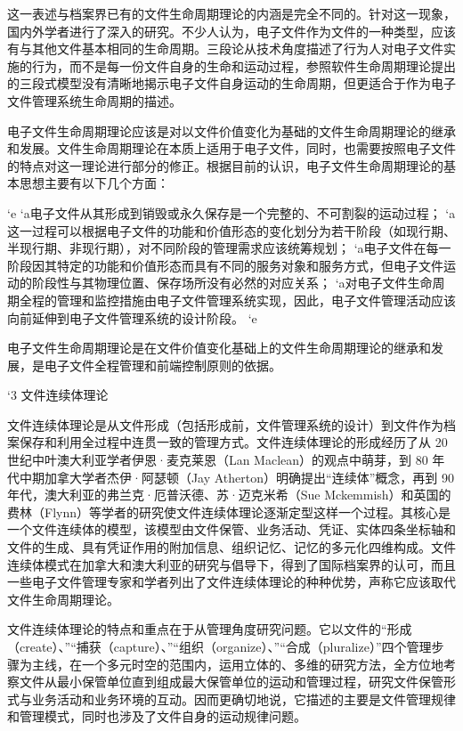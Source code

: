     这一表述与档案界已有的文件生命周期理论的内涵是完全不同的。针对这一现象，国内外学者进行了深入的研究。不少人认为，电子文件作为文件的一种类型，应该有与其他文件基本相同的生命周期。三段论从技术角度描述了行为人对电子文件实施的行为，而不是每一份文件自身的生命和运动过程，参照软件生命周期理论提出的三段式模型没有清晰地揭示电子文件自身运动的生命周期，但更适合于作为电子文件管理系统生命周期的描述。

    电子文件生命周期理论应该是对以文件价值变化为基础的文件生命周期理论的继承和发展。文件生命周期理论在本质上适用于电子文件，同时，也需要按照电子文件的特点对这一理论进行部分的修正。根据目前的认识，电子文件生命周期理论的基本思想主要有以下几个方面：

    `e
        `a电子文件从其形成到销毁或永久保存是一个完整的、不可割裂的运动过程；
        `a这一过程可以根据电子文件的功能和价值形态的变化划分为若干阶段（如现行期、半现行期、非现行期），对不同阶段的管理需求应该统筹规划；
        `a电子文件在每一阶段因其特定的功能和价值形态而具有不同的服务对象和服务方式，但电子文件运动的阶段性与其物理位置、保存场所没有必然的对应关系；
        `a对电子文件生命周期全程的管理和监控措施由电子文件管理系统实现，因此，电子文件管理活动应该向前延伸到电子文件管理系统的设计阶段。
    `e

    电子文件生命周期理论是在文件价值变化基础上的文件生命周期理论的继承和发展，是电子文件全程管理和前端控制原则的依据。

    `3 文件连续体理论

    文件连续体理论是从文件形成（包括形成前，文件管理系统的设计）到文件作为档案保存和利用全过程中连贯一致的管理方式。文件连续体理论的形成经历了从 20 世纪中叶澳大利亚学者伊恩·麦克莱恩（Lan Maclean）的观点中萌芽，到 80 年代中期加拿大学者杰伊·阿瑟顿（Jay Atherton）明确提出“连续体”概念，再到 90 年代，澳大利亚的弗兰克·厄普沃德、苏·迈克米希（Sue Mckemmish）和英国的费林（Flynn）等学者的研究使文件连续体理论逐渐定型这样一个过程。其核心是一个文件连续体的模型，该模型由文件保管、业务活动、凭证、实体四条坐标轴和文件的生成、具有凭证作用的附加信息、组织记忆、记忆的多元化四维构成。文件连续体模式在加拿大和澳大利亚的研究与倡导下，得到了国际档案界的认可，而且一些电子文件管理专家和学者列出了文件连续体理论的种种优势，声称它应该取代文件生命周期理论。

    文件连续体理论的特点和重点在于从管理角度研究问题。它以文件的“形成（create）、”“捕获（capture）、”“组织（organize）、”“合成（pluralize）”四个管理步骤为主线，在一个多元时空的范围内，运用立体的、多维的研究方法，全方位地考察文件从最小保管单位直到组成最大保管单位的运动和管理过程，研究文件保管形式与业务活动和业务环境的互动。因而更确切地说，它描述的主要是文件管理规律和管理模式，同时也涉及了文件自身的运动规律问题。

